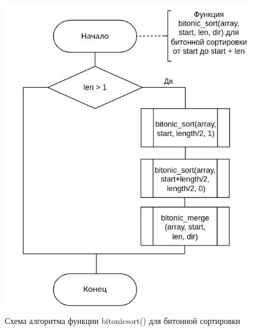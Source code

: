 \clearpage

\begin{figure}[h]
	\centering
	\includegraphics[height=0.7\textheight]{img/bitonic_2.png}
	\caption{Схема алгоритма функции bitonic\textunderscore sort() для битонной сортировки}
	\label{fig:bitonic_sort}
\end{figure}

\clearpage

